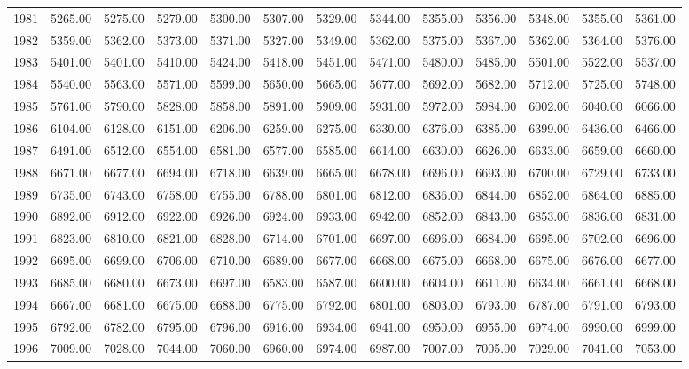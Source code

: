 \begin{longtable}{rrrrrrrrrrrrr}
  1981 & 5265.00 & 5275.00 & 5279.00 & 5300.00 & 5307.00 & 5329.00 & 5344.00 & 5355.00 & 5356.00 & 5348.00 & 5355.00 & 5361.00 \\ 
  1982 & 5359.00 & 5362.00 & 5373.00 & 5371.00 & 5327.00 & 5349.00 & 5362.00 & 5375.00 & 5367.00 & 5362.00 & 5364.00 & 5376.00 \\ 
  1983 & 5401.00 & 5401.00 & 5410.00 & 5424.00 & 5418.00 & 5451.00 & 5471.00 & 5480.00 & 5485.00 & 5501.00 & 5522.00 & 5537.00 \\ 
  1984 & 5540.00 & 5563.00 & 5571.00 & 5599.00 & 5650.00 & 5665.00 & 5677.00 & 5692.00 & 5682.00 & 5712.00 & 5725.00 & 5748.00 \\ 
  1985 & 5761.00 & 5790.00 & 5828.00 & 5858.00 & 5891.00 & 5909.00 & 5931.00 & 5972.00 & 5984.00 & 6002.00 & 6040.00 & 6066.00 \\ 
  1986 & 6104.00 & 6128.00 & 6151.00 & 6206.00 & 6259.00 & 6275.00 & 6330.00 & 6376.00 & 6385.00 & 6399.00 & 6436.00 & 6466.00 \\ 
  1987 & 6491.00 & 6512.00 & 6554.00 & 6581.00 & 6577.00 & 6585.00 & 6614.00 & 6630.00 & 6626.00 & 6633.00 & 6659.00 & 6660.00 \\ 
  1988 & 6671.00 & 6677.00 & 6694.00 & 6718.00 & 6639.00 & 6665.00 & 6678.00 & 6696.00 & 6693.00 & 6700.00 & 6729.00 & 6733.00 \\ 
  1989 & 6735.00 & 6743.00 & 6758.00 & 6755.00 & 6788.00 & 6801.00 & 6812.00 & 6836.00 & 6844.00 & 6852.00 & 6864.00 & 6885.00 \\ 
  1990 & 6892.00 & 6912.00 & 6922.00 & 6926.00 & 6924.00 & 6933.00 & 6942.00 & 6852.00 & 6843.00 & 6853.00 & 6836.00 & 6831.00 \\ 
  1991 & 6823.00 & 6810.00 & 6821.00 & 6828.00 & 6714.00 & 6701.00 & 6697.00 & 6696.00 & 6684.00 & 6695.00 & 6702.00 & 6696.00 \\ 
  1992 & 6695.00 & 6699.00 & 6706.00 & 6710.00 & 6689.00 & 6677.00 & 6668.00 & 6675.00 & 6668.00 & 6675.00 & 6676.00 & 6677.00 \\ 
  1993 & 6685.00 & 6680.00 & 6673.00 & 6697.00 & 6583.00 & 6587.00 & 6600.00 & 6604.00 & 6611.00 & 6634.00 & 6661.00 & 6668.00 \\ 
  1994 & 6667.00 & 6681.00 & 6675.00 & 6688.00 & 6775.00 & 6792.00 & 6801.00 & 6803.00 & 6793.00 & 6787.00 & 6791.00 & 6793.00 \\ 
  1995 & 6792.00 & 6782.00 & 6795.00 & 6796.00 & 6916.00 & 6934.00 & 6941.00 & 6950.00 & 6955.00 & 6974.00 & 6990.00 & 6999.00 \\ 
  1996 & 7009.00 & 7028.00 & 7044.00 & 7060.00 & 6960.00 & 6974.00 & 6987.00 & 7007.00 & 7005.00 & 7029.00 & 7041.00 & 7053.00 \\ 

\end{longtable}
